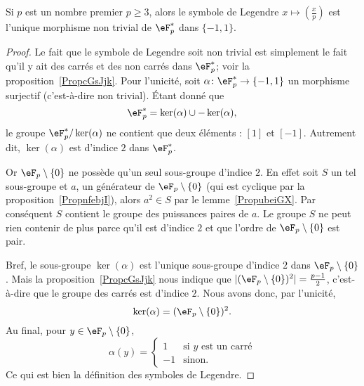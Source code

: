 \begin{lemma}\label{Lemoabzrn}
	Si \( p\) est un nombre premier \( p\geq 3\), alors le symbole de Legendre \( x\mapsto\left(\frac{x}{p}\right)\) est l'unique morphisme non trivial de \( \eF^*_p\) dans \( \{ -1,1 \}\).
\end{lemma}

\begin{proof}
	Le fait que le symbole de Legendre soit non trivial est simplement le fait qu'il y ait des carrés et des non carrés dans \( \eF_p^*\); voir la proposition~\ref{PropcGsJjk}. Pour l'unicité, soit \( \alpha\colon \eF^*_p\to \{ -1,1 \}\) un morphisme surjectif (c'est-à-dire non trivial). Étant donné que
	\begin{equation}
		\eF^*_p=\ker(\alpha)\cup-\ker(\alpha),
	\end{equation}
	le groupe \( \eF_p^*/\ker(\alpha)\) ne contient que deux éléments : \( [1]\) et \( [-1]\). Autrement dit, \( \ker(\alpha)\) est d'indice \( 2\) dans \( \eF_p^*\).

	Or \( \eF_p\setminus\{ 0 \}\) ne possède qu'un seul sous-groupe d'indice \( 2\). En effet soit \( S\) un tel sous-groupe et \( a\), un générateur de \( \eF_p\setminus\{ 0 \}\) (qui est cyclique par la proposition~\ref{PropnfebjI}), alors \( a^2\in S\) par le lemme~\ref{PropubeiGX}. Par conséquent \( S\) contient le groupe des puissances paires de \( a\). Le groupe \( S\) ne peut rien contenir de plus parce qu'il est d'indice \( 2\) et que l'ordre de \( \eF_p\setminus\{ 0 \}\) est pair.

	Bref, le sous-groupe \( \ker(\alpha)\) est l'unique sous-groupe d'indice \( 2\) dans \( \eF_p\setminus\{ 0 \}\). Mais la proposition~\ref{PropcGsJjk} nous indique que \( | (\eF_p\setminus\{ 0 \})^2 |=\frac{ p-1 }{2}\), c'est-à-dire que le groupe des carrés est d'indice \( 2\). Nous avons donc, par l'unicité,
	\begin{equation}
		\ker(\alpha)=(\eF_p\setminus\{ 0 \})^2.
	\end{equation}
	Au final, pour \( y\in \eF_p\setminus\{ 0 \}\),
	\begin{equation}
		\alpha(y)=\begin{cases}
			1  & \text{si } y\text{ est un carré} \\
			-1 & \text{sinon.}
		\end{cases}
	\end{equation}
	Ce qui est bien la définition des symboles de Legendre.
\end{proof}

